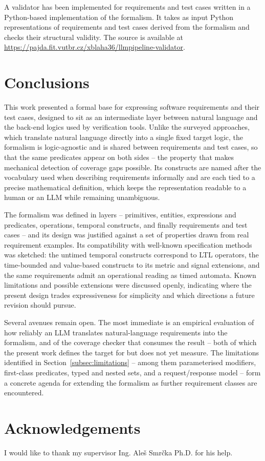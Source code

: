 A validator has been implemented for requirements and test cases written in a Python-based implementation of the formalism. It takes as input Python representations of requirements and test cases derived from the formalism and checks their structural validity. The source is available at \url{https://pajda.fit.vutbr.cz/xblaha36/llmpipeline-validator}.

\section{Conclusions}

This work presented a formal base for expressing software requirements and their test cases, designed to sit as an intermediate layer between natural language and the back-end logics used by verification tools. Unlike the surveyed approaches, which translate natural language directly into a single fixed target logic, the formalism is logic-agnostic and is shared between requirements and test cases, so that the same predicates appear on both sides -- the property that makes mechanical detection of coverage gaps possible. Its constructs are named after the vocabulary used when describing requirements informally and are each tied to a precise mathematical definition, which keeps the representation readable to a human or an LLM while remaining unambiguous.

The formalism was defined in layers -- primitives, entities, expressions and predicates, operations, temporal constructs, and finally requirements and test cases -- and its design was justified against a set of properties drawn from real requirement examples. Its compatibility with well-known specification methods was sketched: the untimed temporal constructs correspond to LTL operators, the time-bounded and value-based constructs to its metric and signal extensions, and the same requirements admit an operational reading as timed automata. Known limitations and possible extensions were discussed openly, indicating where the present design trades expressiveness for simplicity and which directions a future revision should pursue.

Several avenues remain open. The most immediate is an empirical evaluation of how reliably an LLM translates natural-language requirements into the formalism, and of the coverage checker that consumes the result -- both of which the present work defines the target for but does not yet measure. The limitations identified in Section~\ref{subsec:limitations} -- among them parameterised modifiers, first-class predicates, typed and nested sets, and a request/response model -- form a concrete agenda for extending the formalism as further requirement classes are encountered.

\section*{Acknowledgements}
I would like to thank my supervisor Ing. Aleš Smrčka Ph.D. for his help.
